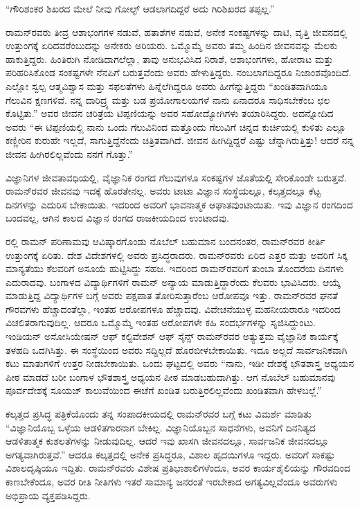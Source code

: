 “ಗೌರಿಶಂಕರ ಶಿಖರದ ಮೇಲೆ ನೀವು ಗೋಲ್ಫ್ ಆಡಲಾಗದಿದ್ದರೆ ಅದು ಗಿರಿಶಿಖರದ ತಪ್ಪಲ್ಲ.”

ರಾಮನ್‍ರವರು ತೀವ್ರ ಆಶಾಭಂಗಗಳ ನಡುವೆ, ಹತಾಶೆಗಳ ನಡುವೆ, ಅನೇಕ ಸಂಕಷ್ಟಗಳನ್ನು ದಾಟಿ, ವೃತ್ತಿ ಜೀವನದಲ್ಲಿ ಉತ್ತುಂಗಕ್ಕೆ ಏರಿದವರೆಂಬುದನ್ನು ಅನೇಕರು ಅರಿಯರು. ಒಮ್ಮೊಮ್ಮೆ ಅವರು ತಮ್ಮ ಹಿಂದಿನ ಜೀವನವನ್ನು ಮೆಲಕು ಹಾಕುತ್ತಿದ್ದರು. ಹಿಂತಿರುಗಿ ನೋಡಿದಾಗಲೆಲ್ಲಾ, ತಾವು ಅನುಭವಿಸಿದ ನಿರಾಶೆ, ಆಶಾಭಂಗಗಳು, ಹೋರಾಟ ಮತ್ತು ಪರಿಹರಿಸಿಕೊಂಡ ಸಂಕಷ್ಟಗಳೇ ನೆನಪಿಗೆ ಬರುತ್ತವೆಂದು ಅವರು ಹೇಳುತ್ತಿದ್ದರು. ನಂಬಲಾಗದಿದ್ದರೂ ನಿಜಾಂಶವೊಂದಿದೆ. ಎಲ್ಲೋ ಸ್ವಲ್ಪ ಆತ್ಮವಿಶ್ವಾಸ ಮತ್ತು ಸಫಲತೆಗಳು ಹಿನ್ನೆಲೆಗಿದ್ದರೂ ಅವರು ಹೀಗೆನ್ನುತ್ತಿದ್ದರು “ಖಂಡಿತವಾಗಿಯೂ ಗೆಲುವಿನ ಕ್ಷಣಗಳಿವೆ. ನನ್ನ ದಾರಿದ್ರ್ಯ ಮತ್ತು ಬಡ ಪ್ರಯೋಗಾಲಯಗಳೆ ನಾನು ಏನಾದರೂ ಸಾಧಿಸಬೇಕೆಂಬ ಛಲ ಕೊಟ್ಟಿತು.” ಅವರ ಜೀವನ ಚರಿತ್ರೆಯ ಟಿಪ್ಪಣಿಯನ್ನು ಅವರ ಸಹೋದ್ಯೋಗಿ\-ಗಳು ತಯಾರಿಸಿದ್ದರು. ಅದನ್ನೋದಿದ ಅವರು “ಈ ಟಿಪ್ಪಣಿಯಲ್ಲಿ ನಾನು ಒಂದು ಗೆಲುವಿನಿಂದ ಮತ್ತೊಂದು ಗೆಲುವಿಗೆ ಚಿನ್ನದ ಕುರ್ಚಿಯಲ್ಲಿ ಕುಳಿತು ಎಲ್ಲೂ ಕಣ್ಣೀರಿನ ಕುರುಹೇ ಇಲ್ಲದೆ, ಸಾಗುತ್ತಿದ್ದೆ\-ನೆಂದು ಚಿತ್ರಿತವಾಗಿದೆ. ಜೀವನ ಹೀಗಿದ್ದಿದ್ದರೆ ಎಷ್ಟು ಚೆನ್ನಾಗಿರುತ್ತಿತ್ತು! ಆದರೆ ನನ್ನ ಜೀವನ ಹೀಗಿರಲಿಲ್ಲವೆಂದು ನನಗೆ ಗೊತ್ತು.”

ವಿಜ್ಞಾನಿಗಳ ಜೀವತಾವಧಿಯಲ್ಲಿ, ವೈಜ್ಞಾನಿಕ ರಂಗದ ಗೆಲುವುಗಳೂ ಸಂಕಷ್ಟಗಳ ಜೊತೆಯಲ್ಲಿ ಸೇರಿಕೊಂಡೇ ಬರುತ್ತವೆ. ರಾಮನ್‍ರವರ ಜೀವನವು ಇದಕ್ಕೆ ಹೊರತೇನಲ್ಲ. ಅವರು ಟಾಟಾ ವಿಜ್ಞಾನ ಸಂಸ್ಥೆಯಲ್ಲೂ, ಕಲ್ಕತ್ತದಲ್ಲೂ ಕೆಟ್ಟ ದಿನಗಳನ್ನು ಎದುರಿಸ ಬೇಕಾಯಿತು. ಇದರಿಂದ ಅವರಿಗೆ ಭಾವನಾತ್ಮಕ ಆಘಾತವುಂಟಾಯಿತು. ಇವು ವಿಜ್ಞಾನ ರಂಗದಿಂದ ಬಂದವಲ್ಲ, ಆಗಿನ ಕಾಲದ ವಿಜ್ಞಾನ ರಂಗದ ರಾಜಕೀಯದಿಂದ ಉಂಟಾದವು.

ರಲ್ಲಿ ರಾಮನ್ ಪರಿಣಾಮವು ಆವಿಷ್ಕಾರಗೊಂಡು ನೊಬೆಲ್ ಬಹುಮಾನ ಬಂದನಂತರ, ರಾಮನ್‍ರವರ ಕೀರ್ತಿ ಉತ್ತುಂಗಕ್ಕೆ ಏರಿತು. ದೇಶ ವಿದೇಶಗಳಲ್ಲಿ ಅವರು ಪ್ರಸಿದ್ಧರಾದರು. ರಾಮನ್‍ರವರು ಏರಿದ ಎತ್ತರ ಮತ್ತು ಅವರಿಗೆ ಸಿಕ್ಕ ಮಾನ್ಯತೆಯು ಕೆಲವರಿಗೆ ಅಸೂಯೆ ಹುಟ್ಟಿಸಿದ್ದು ಸಹಜ. ಇದರಿಂದ ರಾಮನ್‍ರವರಿಗೆ ತುಂಬಾ ತೊಂದರೆಯ ದಿನಗಳು ಎದುರಾದವು. ಬಂಗಾಳದ ವಿದ್ಯಾರ್ಥಿಗಳಿಗೆ ರಾಮನ್ ಅನ್ಯಾಯ ಮಾಡುತ್ತಿದ್ದಾರೆಂದು ಕೆಲವರು ಭಾವಿಸಿದರು. ಆಯ್ಕೆ ಮಾಡುತ್ತಿದ್ದ ವಿದ್ಯಾರ್ಥಿಗಳ ಬಗ್ಗೆ ಅವರು ಪಕ್ಷಪಾತ ತೋರಿಸುತ್ತಾರೆಂಬ ಆರೋಪವೂ ಇತ್ತು. ರಾಮನ್‍ರವರ ಘನತೆ ಗೌರವಗಳು ಹೆಚ್ಚಾದಂತೆಲ್ಲಾ, ಇಂತಹ ಆರೋಪಗಳೂ ಹೆಚ್ಚಾದವು. ವಿವೇಚನೆ\-ಯುಳ್ಳ ಮಹನೀಯರಾರೂ ಇದರಿಂದ ವಿಚಲಿತರಾಗುವುದಿಲ್ಲ. ಆದರೂ ಒಮ್ಮೊಮ್ಮೆ ಇಂತಹ ಆರೋಪಗಳೇ ಕಹಿ ಸಂದರ್ಭಗಳನ್ನು ಸೃಜಿಸಿದ್ದುಂಟು. ಇಂಡಿಯನ್ ಅಸೋಸಿಯೇಷನ್ ಆಫ್ ಕಲ್ಟಿವೇಶನ್ ಆಫ್ ಸೈನ್ಸ್ ರಾಮನ್‍ರವರ ಅತ್ಯುತ್ತಮ ವೈಜ್ಞಾನಿಕ ಕಾರ್ಯಕ್ಕೆ ತಳಹದಿ ಒದಗಿಸಿತ್ತು. ಈ ಸಂಸ್ಥೆಯಿಂದ ಅವರು ಸದ್ದಿಲ್ಲದೆ ಹೊರಬೀಳಬೇಕಾಯಿತು. ಇದೂ ಅಲ್ಲದೆ ಸಾರ್ವಜನಿಕವಾಗಿ ಕಟು ಮಾತುಗಳಿಗೆ ಉತ್ತರ ನೀಡಬೇಕಾಯಿತು. ಒಂದು ಘಟ್ಟದಲ್ಲಿ ಅವರು “ನಾನು, ಇಡೀ ದೇಶಕ್ಕೆ ಭೌತಶಾಸ್ತ್ರ ಅಧ್ಯಯನ ಪೀಠ ಮಾಡದೆ ಬರೀ ಬಂಗಾಳ ಭೌತಶಾಸ್ತ್ರ ಅಧ್ಯಯನ ಪೀಠ ಮಾಡಬಹುದಾಗಿತ್ತು. ಆಗ ನೊಬೆಲ್ ಬಹುಮಾನವು ಪೂರ್ವದೇಶಕ್ಕೆ ಸೂಯಜ್ ಕಾಲುವೆಯಿಂದ ಈಚೆಗೆ ಖಂಡಿತ ಬರುತ್ತಿರಲಿಲ್ಲವೆಂದು ಖಂಡಿತವಾಗಿ ಹೇಳಬಲ್ಲೆ.”

ಕಲ್ಕತ್ತದ ಪ್ರಸಿದ್ಧ ಪತ್ರಿಕೆಯೊಂದು ತನ್ನ ಸಂಪಾದಕೀಯದಲ್ಲಿ ರಾಮನ್‍ರವರ ಬಗ್ಗೆ ಕಟು ವಿಮರ್ಶೆ ಮಾಡಿತು “ವಿಜ್ಞಾನಿಯೊಬ್ಬ ಒಳ್ಳೆಯ ಆಡಳಿತಗಾರನಾಗ ಬೇಕಿಲ್ಲ. ವಿಜ್ಞಾನಿಯೊಬ್ಬನ ಸಾಧನೆಗಳು, ಅವನಿಗೆ ದಿನನಿತ್ಯದ ಆಡಳಿತಾತ್ಮಕ ಕುಶಲತೆಗಳನ್ನು ನೀಡುವುದಿಲ್ಲ. ಆದರೆ ಇವು ಖಾಸಗಿ ಜೀವನದಲ್ಲೂ, ಸಾರ್ವಜನಿಕ ಜೀವನದಲ್ಲೂ ಅಗತ್ಯವಾಗಿರುತ್ತವೆ.” ಆದರೂ ಕಲ್ಕತ್ತದಲ್ಲಿ ಅನೇಕ ಪ್ರಸಿದ್ಧರೂ, ವಿಶಾಲ ಹೃದಯಿಗಳೂ ಇದ್ದರು. ಅವರಿಗೆ ಸಾಕಷ್ಟು ವಿಶಾಲದೃಷ್ಠಿಯೂ ಇದ್ದಿತು. ರಾಮನ್‍ರವರು ವಿಶೇಷ ಪ್ರತಿಭಾಶಾಲಿಗಳೆಂದೂ, ಅವರ ಕಾರ್ಯಶೈಲಿಯನ್ನು ಗೌರವದಿಂದ ಕಾಣಬೇಕೆಂದೂ, ಅವರ ರೀತಿ ನೀತಿಗಳು ಇತರೆ ಸಾಮಾನ್ಯ ಜನರಂತೆ ಇರಬೇಕಾದ ಅಗತ್ಯವಿಲ್ಲವೆಂದೂ ಅವರುಗಳು ಅಭಿಪ್ರಾಯ ವ್ಯಕ್ತಪಡಿಸಿದ್ದರು.

